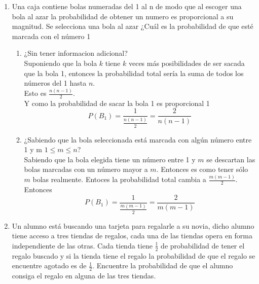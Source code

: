 \documentclass[12pt,a4paper]{report}
\begin{document}
\begin{enumerate}
  \item{
 Una caja contiene bolas numeradas del 1 al n de modo que al escoger una bola al azar la probabilidad de obtener un numero es proporcional a su magnitud. Se selecciona una bola al azar ¿Cuál es la probabilidad de que esté marcada con el número 1\\
 \begin{enumerate}[label= \alph*) ]
 \item{
	 	¿Sin tener informacion adicional?\\
		Suponiendo que la bola $k$ tiene $k$ veces más posibilidades de ser sacada que la bola 1,
		entonces la probabilidad total sería la suma de todos los números del 1 hasta $n$.\\
		Esto es $\frac{n(n-1)}{2}$.\\
		Y como la probabilidad de sacar la bola 1 es proporcional 1
		\begin{equation*}
			P(B_1) = \frac{1}{\frac{n(n-1)}{2}} = \frac{2}{n(n-1)}
		\end{equation*}
	}
 \item{
	 	¿Sabiendo que la bola seleccionada está marcada con algún número entre 1 y m $1\leq m \leq n$?\\
		Sabiendo que la bola elegida tiene un número entre 1 y $m$ se descartan las
		bolas marcadas con un número mayor a $m$. Entonces es como tener sólo $m$ bolas
		realmente. Entoces la probabilidad total cambia a $\frac{m(m-1)}{2}$.
		Entonces
		\begin{equation*}
			P(B_1) = \frac{1}{\frac{m(m-1)}{2}} = \frac{2}{m(m-1)}
		\end{equation*}
	}
 \end{enumerate}
  }

  \item{
		Un alumno está buscando una tarjeta para regalarle a su novia,
		dicho alumno tiene acceso a tres tiendas de regalos, cada una de las tiendas
		opera en forma independiente de las otras. Cada tienda tiene $\frac{1}{2}$
		de probabilidad de tener el regalo buscado y si la tienda tiene el regalo la
		probabilidad de que el regalo se encuentre agotado es de $\frac{1}{2}$.
		Encuentre la probabilidad de que el alumno consiga el regalo en alguna de
		las tres tiendas.\\

}
\end{enumerate}
\end{document}
